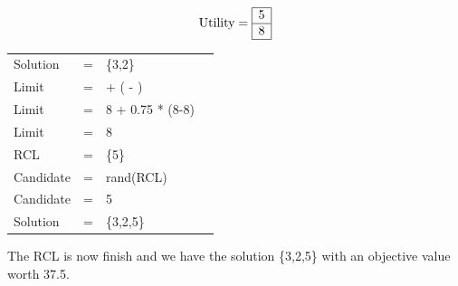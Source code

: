 \documentclass[12pt]{article}
\begin{document}
	$$
	\hbox{Utility} =
	\begin{array}{|c|c|c|c|c|}
		\hline
		 5 \\
		\hline
		 8 \\
		\hline
	\end{array}	
	$$
	\begin{minipage}{\linewidth}
		\centering
		 \label{tab:title}
		\begin{tabular}{L L L L}
			Solution & = & \{3,2\} \\
			Limit & = &  + \alpha \times ( - )\\
			Limit & = & 8 + 0.75 * (8-8) \\
			Limit & = & 8 \\
			RCL & = & \{5\} \\
			Candidate & = & rand(RCL) \\
			Candidate & = & 5\\
			Solution & = & \{3,2,5\}\\
		\end{tabular}
		\bigskip
	\end{minipage}
	The RCL is now finish and we have the solution \{3,2,5\} with an objective value worth 37.5.
	\pagebreak
\end{document}
